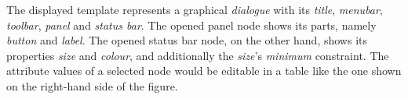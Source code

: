 The displayed template represents a graphical \emph{dialogue} with its
\emph{title}, \emph{menubar}, \emph{toolbar}, \emph{panel} and \emph{status bar}.
The opened panel node shows its parts, namely \emph{button} and \emph{label}.
The opened status bar node, on the other hand, shows its properties \emph{size}
and \emph{colour}, and additionally the \emph{size}'s \emph{minimum} constraint.
The attribute values of a selected node would be editable in a table like the
one shown on the right-hand side of the figure.

